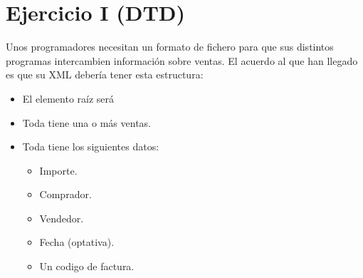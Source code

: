 \documentclass[letterpaper,10pt,spanish]{sphinxmanual}
\begin{document}
\section{Ejercicio I (DTD)}
\label{tema5:ejercicio-i-dtd}
Unos programadores necesitan un formato de fichero para que sus distintos programas intercambien información sobre ventas. El acuerdo al que han llegado es que su XML debería tener esta estructura:
\begin{itemize}
\item {} 
El elemento raíz será 

\item {} 
Toda  tiene una o más ventas.

\item {} 
Toda  tiene los siguientes datos:
\begin{itemize}
\item {} 
Importe.

\item {} 
Comprador.

\item {} 
Vendedor.

\item {} 
Fecha (optativa).

\item {} 
Un codigo de factura.

\end{itemize}

\end{itemize}
\end{document}
